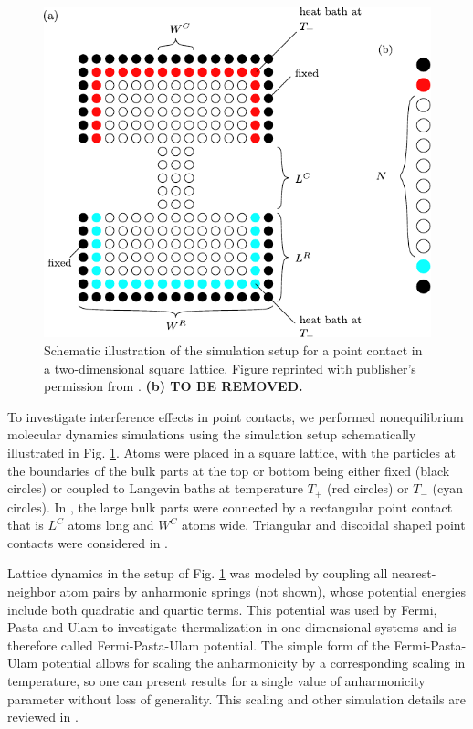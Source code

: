 \begin{figure}
\begin{center}
 \includegraphics[width=.85\columnwidth]{pics/fpu_fig1.pdf}
 \caption{Schematic illustration of the simulation setup for a point contact in a two-dimensional square lattice. Figure reprinted with publisher's permission from . \textbf{(b) TO BE REMOVED.}}
\label{fig:fpu_fig1}
\end{center}
\end{figure}

To investigate interference effects in point contacts, we performed nonequilibrium molecular dynamics simulations using the simulation setup schematically illustrated in Fig. \ref{fig:fpu_fig1}. Atoms were placed in a square lattice, with the particles at the boundaries of the bulk parts at the top or bottom being either fixed (black circles) or coupled to Langevin baths at temperature $T_+$ (red circles) or $T_-$ (cyan circles). In , the large bulk parts were connected by a rectangular point contact that is $L^C$ atoms long and $W^C$ atoms wide. Triangular and discoidal shaped point contacts were considered in . 

Lattice dynamics in the setup of Fig. \ref{fig:fpu_fig1} was modeled by coupling all nearest-neighbor atom pairs by anharmonic springs (not shown), whose potential energies include both quadratic and quartic terms. This potential was used by Fermi, Pasta and Ulam to investigate thermalization in one-dimensional systems \cite{fermi55} and is therefore called Fermi-Pasta-Ulam potential. The simple form of the Fermi-Pasta-Ulam potential allows for scaling the anharmonicity by a corresponding scaling in temperature, so one can present results for a single value of anharmonicity parameter without loss of generality. This scaling and other simulation details are reviewed in . 


